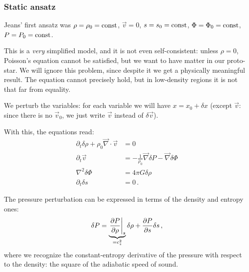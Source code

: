 \documentclass[main.tex]{subfiles}
\begin{document}
\subsubsection{Static ansatz}

Jeans' first ansatz was \(\rho = \rho_0 = \text{const}\), \(\vec{v} = 0\), \(s = s_0 =  \text{const}\), \(\Phi = \Phi_0 = \text{const}\), \(P =P_0 = \text{const}\). 

This is a \emph{very} simplified model, and it is not even self-consistent: unless \(\rho  = 0\), Poisson's equation cannot be satisfied, but we want to have matter in our proto-star.
We will ignore this problem, since despite it we get a physically meaningful result.
The equation cannot precisely hold, but in low-density regions it is not that far from equality.

We perturb the variables: for each variable we will have \(x = x_0 + \delta x\) (except \(\vec{v}\): since there is no \(\vec{v}_0 \), we just write \(\vec{v}\) instead of \(\delta \vec{v}\)). 

With this, the equations read:
%
\begin{align}
  \partial_{t} \delta \rho  +
  \rho_0 \vec{\nabla} \cdot \vec{v} &= 0 \\
  \partial_{t} \vec{v} &= - \frac{1}{\rho_0 } \vec{\nabla} \delta P - \vec{\nabla} \delta \Phi \\
  \nabla^2 \delta \Phi &= 4 \pi G \delta \rho  \\
  \partial_{t} \delta s &= 0
\,.
\end{align}

The pressure perturbation can be expressed in terms of the density and entropy ones:
%
\begin{align}
  \delta P = \underbrace{\eval{\pdv{P}{\rho }}_{s}}_{= c_s^2} \delta \rho + \pdv{P}{s} \delta s
\,,
\end{align}
%
where we recognize the constant-entropy derivative of the pressure with respect to the density: the square of the adiabatic speed of sound.



\end{document}
